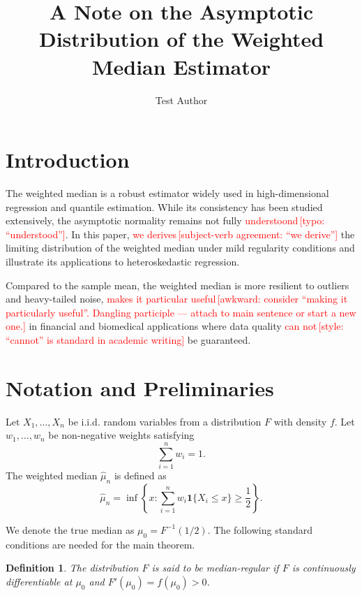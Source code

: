 \documentclass[12pt]{article}
\title{A Note on the Asymptotic Distribution of the Weighted Median Estimator}
\author{Test Author}
\date{}
\newtheorem{definition}{Definition}
\newcommand{\grammarcheck}[2]{\textcolor{red}{#1}\,\textcolor{red}{[#2]}}
\begin{document}
\maketitle

\section{Introduction}

The weighted median is a robust estimator widely used in high-dimensional regression and quantile estimation. While its consistency has been studied extensively, the asymptotic normality remains not fully \grammarcheck{understoond}{typo: ``understood''}. In this paper, \grammarcheck{we derives}{subject-verb agreement: ``we derive''} the limiting distribution of the weighted median under mild regularity conditions and illustrate its applications to heteroskedastic regression.

Compared to the sample mean, the weighted median is more resilient to outliers and heavy-tailed noise, \grammarcheck{makes it particular useful}{awkward: consider ``making it particularly useful''. Dangling participle --- attach to main sentence or start a new one.} in financial and biomedical applications where data quality \grammarcheck{can not}{style: ``cannot'' is standard in academic writing} be guaranteed.

\section{Notation and Preliminaries}

Let $X_1, \ldots, X_n$ be i.i.d. random variables from a distribution $F$ with density $f$. Let $w_1, \ldots, w_n$ be non-negative weights satisfying
\begin{equation}
    \sum_{i=1}^n w_i = 1.
\end{equation}
The weighted median $\hat{\mu}_n$ is defined as
\begin{equation}
    \hat{\mu}_n = \inf\left\{ x : \sum_{i=1}^n w_i \mathbf{1}\{X_i \leq x\} \geq \frac{1}{2} \right\}.
\end{equation}

We denote the true median as $\mu_0 = F^{-1}(1/2)$. The following standard conditions are needed for the main theorem.

\begin{definition}
The distribution $F$ is said to be \textit{median-regular} if $F$ is continuously differentiable at $\mu_0$ and $F'(\mu_0) = f(\mu_0) > 0$.
\end{definition}
\end{document}
